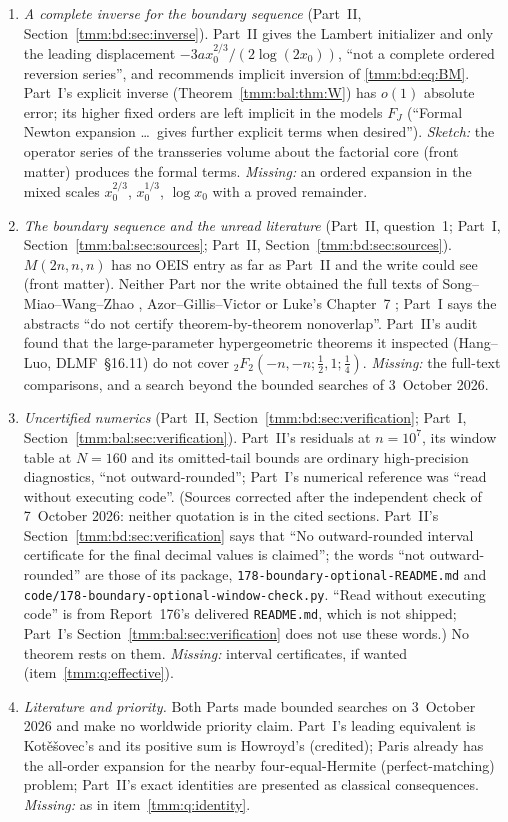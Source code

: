 \documentclass[11pt,letterpaper]{article}
\theoremstyle{remark}\newtheorem{remark}[theorem]{Remark}
\newcommand{\file}[1]{\nolinkurl{#1}}
\begin{document}
\begin{enumerate}
\item\label{tmm:q:reversion} \emph{A complete inverse for the boundary sequence} (Part~II, Section~\ref{tmm:bd:sec:inverse}). Part~II gives the Lambert initializer and only the leading displacement $-3ax_0^{2/3}/(2\log(2x_0))$, ``not a complete ordered reversion series'', and recommends implicit inversion of \eqref{tmm:bd:eq:BM}. Part~I's explicit inverse (Theorem~\ref{tmm:bal:thm:W}) has $o(1)$ absolute error; its higher fixed orders are left implicit in the models $F_J$ (``Formal Newton expansion \dots\ gives further explicit terms when desired''). \emph{Sketch:} the operator series of the transseries volume about the factorial core (front matter) produces the formal terms. \emph{Missing:} an ordered expansion in the mixed scales $x_0^{2/3}$, $x_0^{1/3}$, $\log x_0$ with a proved remainder.
\item\label{tmm:q:identity} \emph{The boundary sequence and the unread literature} (Part~II, question~1; Part~I, Section~\ref{tmm:bal:sec:sources}; Part~II, Section~\ref{tmm:bd:sec:sources}). $M(2n,n,n)$ has no OEIS entry as far as Part~II and the write could see (front matter). Neither Part nor the write obtained the full texts of Song--Miao--Wang--Zhao \cite{song}, Azor--Gillis--Victor \cite{azor} or Luke's Chapter~7 \cite{luke}; Part~I says the abstracts ``do not certify theorem-by-theorem nonoverlap''. Part~II's audit found that the large-parameter hypergeometric theorems it inspected (Hang--Luo, DLMF~\S16.11) do not cover ${}_2F_2(-n,-n;\frac12,1;\frac14)$. \emph{Missing:} the full-text comparisons, and a search beyond the bounded searches of 3~October 2026.
\item\label{tmm:q:diagnostics} \emph{Uncertified numerics} (Part~II, Section~\ref{tmm:bd:sec:verification}; Part~I, Section~\ref{tmm:bal:sec:verification}). Part~II's residuals at $n=10^7$, its window table at $N=160$ and its omitted-tail bounds are ordinary high-precision diagnostics, ``not outward-rounded''; Part~I's numerical reference was ``read without executing code''. \textup{(Sources corrected after the independent check of 7~October 2026: neither quotation is in the cited sections. Part~II's Section~\ref{tmm:bd:sec:verification} says that ``No outward-rounded interval certificate for the final decimal values is claimed''; the words ``not outward-rounded'' are those of its package, \file{178-boundary-optional-README.md} and \file{code/178-boundary-optional-window-check.py}. ``Read without executing code'' is from Report~176's delivered \file{README.md}, which is not shipped; Part~I's Section~\ref{tmm:bal:sec:verification} does not use these words.)} No theorem rests on them. \emph{Missing:} interval certificates, if wanted (item~\ref{tmm:q:effective}).
\item\label{tmm:q:literature} \emph{Literature and priority.} Both Parts made bounded searches on 3~October 2026 and make no worldwide priority claim. Part~I's leading equivalent is Kot\v{e}\v{s}ovec's and its positive sum is Howroyd's (credited); Paris already has the all-order expansion for the nearby four-equal-Hermite (perfect-matching) problem; Part~II's exact identities are presented as classical consequences. \emph{Missing:} as in item~\ref{tmm:q:identity}.
\end{enumerate}
\end{document}
